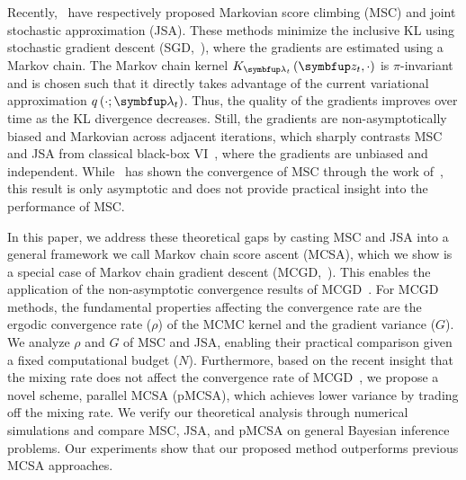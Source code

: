 Recently,~\citet{NEURIPS2020_b2070693,pmlr-v124-ou20a} have respectively proposed Markovian score climbing (MSC) and joint stochastic approximation (JSA).
These methods minimize the inclusive KL using stochastic gradient descent (SGD,~\citealt{robbins_stochastic_1951}), where the gradients are estimated using a Markov chain.
The Markov chain kernel \(K_{\vlambda_t}\left(\vz_t, \cdot\right)\) is \(\pi\)-invariant~\citep{robert_monte_2004} and is chosen such that it directly takes advantage of the current variational approximation \(q\left(\cdot; \vlambda_t\right)\).
Thus, the quality of the gradients improves over time as the KL divergence decreases.
Still, the gradients are non-asymptotically biased and Markovian across adjacent iterations, which sharply contrasts MSC and JSA from classical black-box VI~\citep{pmlr-v33-ranganath14, JMLR:v18:16-107}, where the gradients are unbiased and independent.
While~\citet{NEURIPS2020_b2070693} has shown the convergence of MSC through the work of~\citet{gu_stochastic_1998}, this result is only asymptotic and does not provide practical insight into the performance of MSC.

%

In this paper, we address these theoretical gaps by casting MSC and JSA into a general framework we call Markov chain score ascent (MCSA), which we show is a special case of Markov chain gradient descent (MCGD,~\citealt{duchi_ergodic_2012}).
This enables the application of the non-asymptotic convergence results of MCGD~\citep{duchi_ergodic_2012, NEURIPS2018_1371bcce, pmlr-v99-karimi19a, doan_finitetime_2020, doan_convergence_2020, Xiong_Xu_Liang_Zhang_2021, debavelaere_convergence_2021}.
For MCGD methods, the fundamental properties affecting the convergence rate are the ergodic convergence rate (\(\rho\)) of the MCMC kernel and the gradient variance (\(G\)).
We analyze \(\rho\) and \(G\) of MSC and JSA, enabling their practical comparison given a fixed computational budget (\(N\)).
Furthermore, based on the recent insight that the mixing rate does not affect the convergence rate of MCGD~\citep{doan_convergence_2020,doan_finitetime_2020}, we propose a novel scheme, parallel MCSA (pMCSA), which achieves lower variance by trading off the mixing rate.
We verify our theoretical analysis through numerical simulations and compare MSC, JSA, and pMCSA on general Bayesian inference problems.
Our experiments show that our proposed method outperforms previous MCSA approaches.

